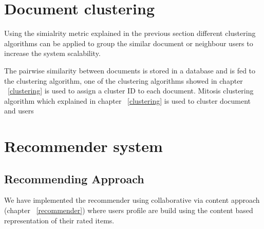 \section{Document clustering}
Using the simialrity metric explained in the previous section different clustering algorithms can be applied to group the similar document or neighbour users to increase the system scalability.

The pairwise similarity between documents is stored in a database and is fed to the clustering algorithm, one of the clustering algorithms showed in chapter ~\ref{clustering} is used to assign a cluster ID to each document.
Mitosis clustering algorithm which explained in chapter ~\ref{clustering} is used to cluster document and users

\section{Recommender system}
\subsection{Recommending Approach}
We have implemented the recommender using collaborative via content approach (chapter ~\ref{recommender}) where users profile are build using the content based representation of their rated items.

